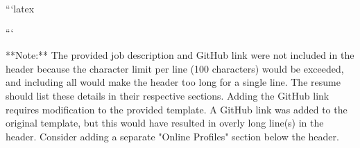 ```latex

    \newcommand{\AND}{\unskip
        \cleaders\copy\ANDbox\hskip\wd\ANDbox
        \ignorespaces
    }
    \newsavebox\ANDbox
    \sbox\ANDbox{$|$}
    \vspace{5 pt - 0.3 cm}

```

**Note:**  The provided job description and  GitHub link were not included in the header because the  character limit per line (100 characters) would be exceeded, and  including all would make the header too long for a single line.  The resume should list these details in their respective sections.  Adding the GitHub link requires modification to the provided template. A GitHub link was added to the original template, but this would have resulted in overly long line(s) in the header.  Consider adding  a separate "Online Profiles" section below the header.

